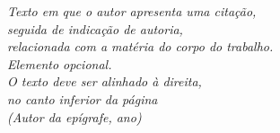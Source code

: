 \begin{epigrafe}
\vspace*{\fill}
\begin{flushright}
\emph{Texto em que o autor apresenta uma citação,\\
seguida de indicação de autoria, \\
relacionada com a matéria do corpo do trabalho.\\
Elemento opcional. \\
O texto deve ser alinhado à direita, \\
no canto inferior da página\\
(Autor da epígrafe, ano)}
\end{flushright}
\end{epigrafe}